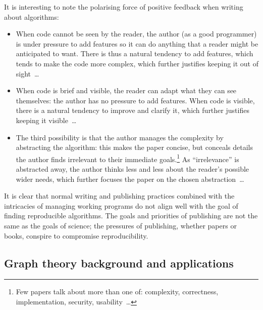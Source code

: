 \documentclass[preprint,times]{elsarticle}
\begin{document}
It is interesting to note the polarising force of positive feedback when writing about algorithms:

\begin{itemize}\raggedright 
\item When code cannot be seen by the reader, the author (as a good programmer) is under pressure to add features so it can do anything that a reader might be anticipated to want. There is thus a natural tendency to add features, which tends to make the code more complex, which further justifies keeping it out of sight~\ldots 

\item When code is brief and visible, the reader can adapt what they can see themselves: the author has no pressure to add features. When code is visible, there is a natural tendency to improve and clarify it, which further justifies keeping it visible~\ldots 

\item The third possibility is that the author manages the complexity by abstracting the algorithm: this makes the paper concise, but conceals details the author finds irrelevant to their immediate goals.\footnote{Few papers talk about more than one of: complexity, correctness, implementation, security, usability~\ldots} As ``irrelevance'' is abstracted away, the author thinks less and less about the reader's possible wider needs, which further focuses the paper on the chosen abstraction~\ldots
\end{itemize}

It is clear that normal writing and publishing practices combined with the intricacies of managing working programs do not align well with the goal of finding reproducible algorithms. The goals and priorities of publishing are not the same as the goals of science; the pressures of publishing, whether papers or books, conspire to compromise reproducibility. 


\subsection{Graph theory background and applications}\label{graphtheory}
\end{document}
